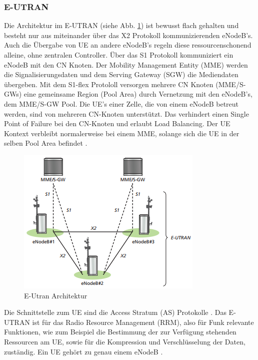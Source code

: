 \subsubsection{E-UTRAN}
\label{subsubsec:eutran}
Die Architektur im E-UTRAN (siehe Abb. \ref{fig:eutranarchitektur}) ist bewusst flach gehalten und besteht nur aus miteinander über das X2 Protokoll kommunizierenden eNodeB's. Auch die Übergabe von UE an andere eNodeB's regeln diese ressourcenschonend alleine, ohne zentralen Controller. Über das S1 Protokoll kommuniziert ein eNodeB mit den CN Knoten. Der Mobility Management Entity (MME) werden die Signalisierungsdaten und dem Serving Gateway (SGW) die Mediendaten übergeben. Mit dem S1-flex Protololl versorgen mehrere CN Knoten (MME/S-GWs) eine gemeinsame Region (Pool Area) durch Vernetzung mit den eNodeB's, dem MME/S-GW Pool. Die UE's einer Zelle, die von einem eNodeB betreut werden, sind von mehreren CN-Knoten unterstützt. Das verhindert einen Single Point of Failure bei den CN-Knoten und erlaubt Load Balancing. Der UE Kontext verbleibt normalerweise bei einem MME, solange sich die UE in der selben Pool Area befindet \cite{Ses11}.
\begin{figure}[H]
	\centering
	\includegraphics[width=1\linewidth]{images/E_UTRAN_Architektur}
	\caption[]{E-Utran Architektur \protect\cite{Ses11}}
	\label{fig:eutranarchitektur}
\end{figure}
Die Schnittstelle zum UE sind die Access Stratum (AS) Protokolle \cite[S. 131]{Sau06}. Das E-UTRAN ist für das Radio Resource Management (RRM), also für Funk relevante Funktionen, wie zum Beispiel die Bestimmung der zur Verfügung stehenden Ressourcen  am UE, sowie für die Kompression und Verschlüsselung der Daten, zuständig. Ein UE gehört zu genau einem eNodeB \cite{Ses11}.
